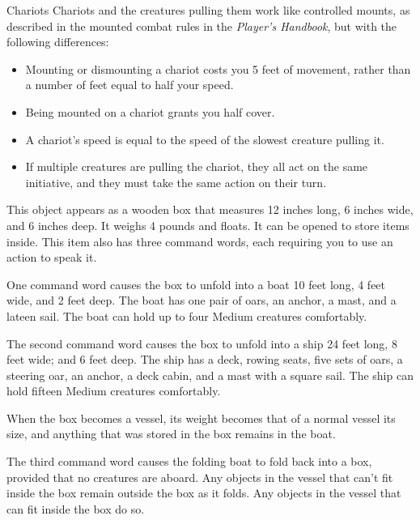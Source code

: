 \documentclass[10pt,a4paper,twoside,bg=print,twocolumn,openany,nodeprecatedcode]{dndbook}
\begin{document}
\begin{DndSidebar}[float=!b]{Chariots}
Chariots and the creatures pulling them work like controlled mounts, as described in the mounted combat rules in the \textit{Player's Handbook}, but with the following differences:




\begin{itemize}
\item Mounting or dismounting a chariot costs you 5 feet of movement, rather than a number of feet equal to half your speed.
\item Being mounted on a chariot grants you half cover.
\item A chariot's speed is equal to the speed of the slowest creature pulling it.
\item If multiple creatures are pulling the chariot, they all act on the same initiative, and they must take the same action on their turn.
\end{itemize}



\end{DndSidebar}

This object appears as a wooden box that measures 12 inches long, 6 inches wide, and 6 inches deep. It weighs 4 pounds and floats. It can be opened to store items inside. This item also has three command words, each requiring you to use an action to speak it.

One command word causes the box to unfold into a boat 10 feet long, 4 feet wide, and 2 feet deep. The boat has one pair of oars, an anchor, a mast, and a lateen sail. The boat can hold up to four Medium creatures comfortably.

The second command word causes the box to unfold into a ship 24 feet long, 8 feet wide; and 6 feet deep. The ship has a deck, rowing seats, five sets of oars, a steering oar, an anchor, a deck cabin, and a mast with a square sail. The ship can hold fifteen Medium creatures comfortably.

When the box becomes a vessel, its weight becomes that of a normal vessel its size, and anything that was stored in the box remains in the boat.

The third command word causes the folding boat to fold back into a box, provided that no creatures are aboard. Any objects in the vessel that can't fit inside the box remain outside the box as it folds. Any objects in the vessel that can fit inside the box do so.
\end{document}
